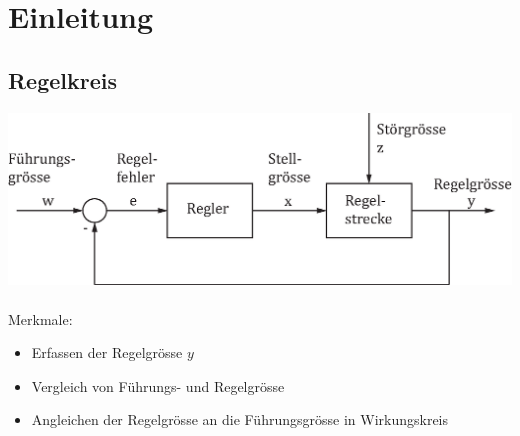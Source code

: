 



\chapter{Einleitung}

\section{Regelkreis}
\includegraphics[width = \linewidth]{images/regelkreis.eps}
\\\\
Merkmale:
\begin{itemize}
	\item Erfassen der Regelgrösse $y$
	\item Vergleich von Führungs- und Regelgrösse
	\item Angleichen der Regelgrösse an die Führungsgrösse in Wirkungskreis
\end{itemize}


